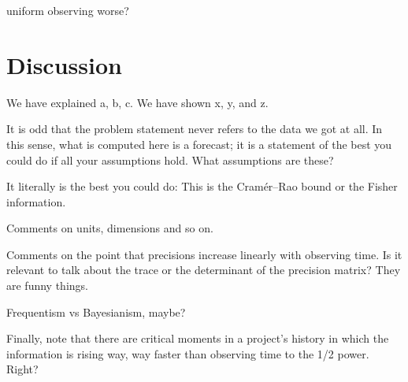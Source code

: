 \documentclass[10pt, letterpaper]{article}
\begin{document}
uniform observing worse?

\section{Discussion}\label{sec:discussion}

We have explained a, b, c. We have shown x, y, and z.

It is odd that the problem statement never refers to the data we got at all.
In this sense, what is computed here is a forecast; it is a statement of the
best you could do if all your assumptions hold. What assumptions are these?

It literally is the best you could do:
This is the Cram\'er--Rao bound or the Fisher information.

Comments on units, dimensions and so on.

Comments on the point that precisions increase linearly with observing time.
Is it relevant to talk about the trace or the determinant of the precision
matrix? They are funny things.

Frequentism vs Bayesianism, maybe?

Finally, note that there are critical moments in a project's history in which
the information is rising way, way faster than observing time to the 1/2 power.
Right?

\clearmargin\clearpage\raggedright

\end{document}
